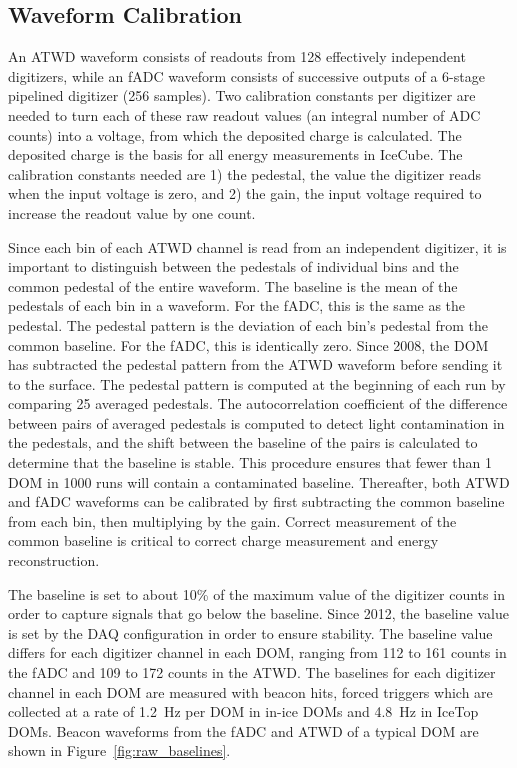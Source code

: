 \subsection{\label{sec:waveformcal}Waveform Calibration}

An ATWD waveform consists of readouts from 128 effectively independent
digitizers, while an fADC waveform consists of successive outputs of a 6-stage
pipelined digitizer (256 samples). Two calibration constants per digitizer are needed to turn each of these
raw readout values (an integral number of ADC counts) into a
voltage, from which the deposited charge is calculated. The deposited
charge is the basis for all energy measurements in IceCube. The
calibration constants needed are 1) the pedestal, the value the digitizer reads when the input voltage is zero, and
2) the gain, the input voltage required to increase the readout value by one count. 

Since each bin of each ATWD channel is read from an independent
digitizer, it is important to distinguish between the pedestals of
individual bins and the common pedestal of the entire waveform. The
baseline is the mean of the pedestals of each bin in a waveform. For
the fADC, this is the same as the pedestal. The pedestal pattern is
the deviation of each bin's pedestal from the common baseline. For the
fADC, this is identically zero. Since 2008, the DOM has subtracted the
pedestal pattern from
the ATWD waveform before sending it to the surface. The pedestal pattern is computed at the beginning of each
run by comparing 25 averaged pedestals. The autocorrelation coefficient
of the difference between pairs of averaged pedestals is computed to detect light
contamination in the pedestals, and the shift between the baseline of
the pairs is calculated to determine that the baseline is stable. This
procedure ensures that fewer than 1 DOM in 1000 runs will contain a
contaminated baseline. Thereafter, both ATWD
and fADC waveforms can be calibrated by first subtracting the common
baseline from each bin, then multiplying by the gain. Correct
measurement of the common baseline is critical to correct charge
measurement and energy reconstruction.

The baseline is set to about 10\% of the maximum value of the
digitizer counts in
order to capture signals that go below the baseline. Since 2012, the
baseline value is set by the DAQ configuration in order to ensure 
stability. The baseline value differs for each digitizer channel in
each DOM, ranging from 112 to 161 counts in the fADC and 109 to 172
counts in the ATWD. The baselines for each digitizer channel in each DOM are measured with
beacon hits, forced triggers which are collected at a rate of 1.2~Hz
per DOM
in in-ice DOMs and 4.8~Hz in IceTop DOMs. Beacon waveforms
from the fADC and ATWD of a typical DOM are shown in Figure~\ref{fig:raw_baselines}.

